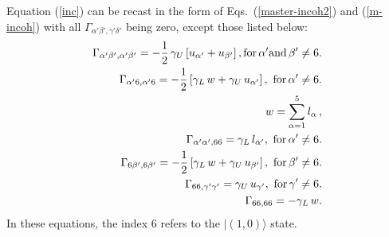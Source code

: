 \documentclass[prb,twocolumn,showpacs,floats]{revtex4}
\begin{document}
Equation (\ref{inc}) can be recast in the form of Eqs.~(\ref{master-incoh2}) and (\ref{m-incoh})
with all $\Gamma_{\alpha' \beta',\gamma' \delta'}$ being zero, except those listed below:
\begin{eqnarray}
\Gamma_{\alpha' \beta',\alpha' \beta'} = - \frac{1}{2} \, \gamma_U
 \left[  u_{\alpha'} +  u_{\beta'}  \right] ,   {\rm for} \, \alpha'  {\rm and} \, \beta' \neq 6.  \\
%
\Gamma_{\alpha' 6,\alpha' 6}  = - \frac{1}{2} \left[ \gamma_L \, w + \gamma_U
 \,  u_{\alpha'} \right] , \, \, {\rm for} \, \alpha' \neq 6.  \\
%
w  = \sum_{\alpha=1}^5  l_{\alpha} \, ,  \\
%
\Gamma_{\alpha' \alpha',66}  = \gamma_L \,   l_{\alpha'}  , \, \, {\rm for} \, \alpha' \neq 6.  \\
%
\Gamma_{6 \beta', 6 \beta'}  = - \frac{1}{2} \left[ \gamma_L \, w + \gamma_U\, 
 u_{\beta'}  \right] , \, \, {\rm for} \, \beta' \neq 6.  \\
%
\Gamma_{6 6, \gamma' \gamma'}  = \gamma_U \,  u_{\gamma'}  , \, \, {\rm for} \, \gamma' \neq 6.  \\
%
\Gamma_{6 6, 6 6}  = - \gamma_L \, w  .
\end{eqnarray}
In these equations, the index 6 refers to the $| (1,0) \rangle $ state.
\end{document}

